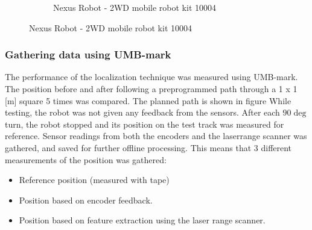 \begin{figure}[ht]
\begin{subfigure}[t]{0.4\textwidth}
    \caption{Nexus Robot - 2WD mobile robot kit 10004}
    \label{laserrange}
  \end{subfigure}
\end{figure}

\subsubsection{Gathering data using UMB-mark}
The performance of the localization technique was measured using UMB-mark. 
The position before and after following a preprogrammed path through a 1 x 1 [m] square 5 times was compared. The planned path is shown in figure 
While testing, the robot was not given any feedback from the sensors. After each $90 \deg$ turn, the robot stopped and its position on the test track was measured for reference.  
Sensor readings from both the encoders and the laserrange scanner was gathered, and saved for further offline processing. 
This means that 3 different measurements of the position was gathered: 
\begin{itemize}
	\item Reference position (measured with tape)
	\item Position based on encoder feedback. 
	\item Position based on feature extraction using the laser range scanner. 
\end{itemize}


